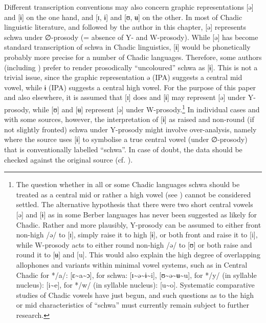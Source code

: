 \documentclass[output=paper]{langscibook}
\begin{document}
Different transcription conventions may also concern graphic representations [ə] and [ɨ] on the one hand, and [ɪ, ɨ] and [ʊ, ʉ] on the other. In most of Chadic linguistic literature, and followed by the author in this chapter, [ə] represents schwa under ∅-prosody (= absence of Y- and W-prosody). While [ə] has become standard transcription of schwa in Chadic linguistics, [ɨ] would be phonetically probably more precise for a number of Chadic languages. Therefore, some authors (including \citealt{Gravina2014,Gravina2015}) prefer to render prosodically ``uncoloured'' schwa as [ɨ]. This is not a trivial issue, since the graphic representation ə (IPA) suggests a central mid vowel, while ɨ (IPA) suggests a central high vowel. For the purpose of this paper and also elsewhere, it is assumed that [ɪ] does and [ɨ] may represent [ə] under Y-prosody, while [ʊ] and [ʉ] represent [ə] under W-prosody.\footnote{The question whether in all or some Chadic languages schwa should be treated as a central mid or rather a high vowel (see \citealt{Roberts2001}) cannot be considered settled. The alternative hypothesis that there were two short central vowels [ə] and [ɨ] as in some Berber languages has never been suggested as likely for Chadic. Rather and more plausibly, Y-prosody can be assumed to either front non-high /ə/ to [ɪ], simply raise it to high [ɨ], or both front and raise it to [i], while W-prosody acts to either round non-high /ə/ to [ʊ] or both raise and round it to [ʉ] and [u]. This would also explain the high degree of overlapping allophones and variants within minimal vowel systems, such as in Central Chadic for */a/: [ɛ{\textasciitilde}a{\textasciitilde}ɔ], for schwa: [ɪ{\textasciitilde}ə{\textasciitilde}ɨ{\textasciitilde}i], [ʊ{\textasciitilde}ə{\textasciitilde}ʉ{\textasciitilde}u], for */y/ (in syllable nucleus): [i{\textasciitilde}e], for */w/ (in syllable nucleus): [u{\textasciitilde}o]. Systematic comparative studies of Chadic vowels have just begun, and such questions as to the high or mid characteristics of ``schwa'' must currently remain subject to further research.} In individual cases and with some sources, however, the interpretation of [ɨ] as raised and non-round (if not slightly fronted) schwa under Y-prosody might involve over-analysis, namely where the source uses [ɨ] to symbolise a true central vowel (under ∅-prosody) that is conventionally labelled ``schwa''.  In case of doubt, the data should be checked against the original source (cf. \citealt{Gravina2015}).
\end{document}
